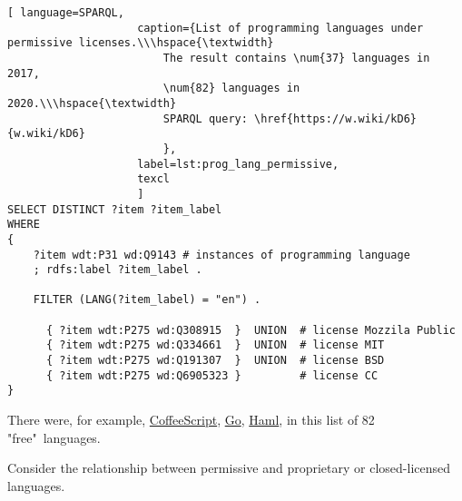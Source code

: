 \begin{lstlisting}[ language=SPARQL, 
                    caption={List of programming languages under permissive licenses.\\\hspace{\textwidth}
                        The result contains \num{37} languages in 2017, 
                        \num{82} languages in 2020.\\\hspace{\textwidth}
                        SPARQL query: \href{https://w.wiki/kD6}{w.wiki/kD6}
                        },
                    label=lst:prog_lang_permissive,
                    texcl 
                    ]
SELECT DISTINCT ?item ?item_label
WHERE
{
    ?item wdt:P31 wd:Q9143 # instances of programming language
    ; rdfs:label ?item_label . 

    FILTER (LANG(?item_label) = "en") . 
  
      { ?item wdt:P275 wd:Q308915  }  UNION  # license Mozzila Public
      { ?item wdt:P275 wd:Q334661  }  UNION  # license MIT
      { ?item wdt:P275 wd:Q191307  }  UNION  # license BSD
      { ?item wdt:P275 wd:Q6905323 }         # license CC
}
\end{lstlisting}%

There were, for example, \href{https://en.wikipedia.org/wiki/CoffeeScript}{CoffeeScript}, \href{https://en.wikipedia.org/wiki/Go}{Go}, \href{https://en.wikipedia.org/wiki/Haml}{Haml}, in this list of 82 "free"\  languages.

Consider the relationship between permissive and proprietary or closed-licensed languages.

